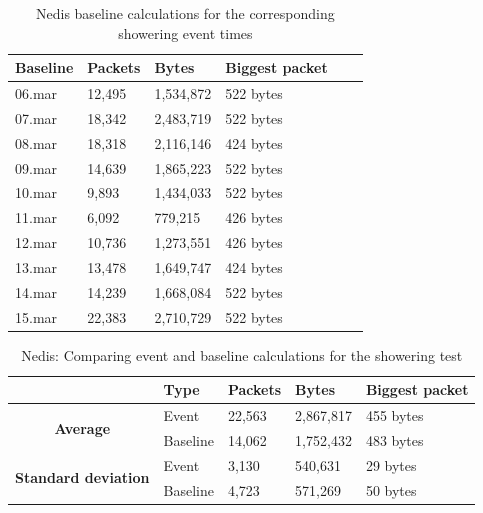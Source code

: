 \begin{table}[H]
    \centering
    \caption{Nedis baseline calculations for the corresponding showering event times}
    \begin{tabular}{|l|l|l|l|l|l|}
    \hline
        \textbf{Baseline} & \textbf{Packets} & \textbf{Bytes} & \textbf{Biggest packet} \\ \hline
        06.mar & 12,495 & 1,534,872 & 522 bytes \\ \hline
        07.mar & 18,342 & 2,483,719 & 522 bytes \\ \hline
        08.mar & 18,318 & 2,116,146 & 424 bytes \\ \hline
        09.mar & 14,639 & 1,865,223 & 522 bytes \\ \hline
        10.mar & 9,893  & 1,434,033 & 522 bytes \\ \hline
        11.mar & 6,092  & 779,215   & 426 bytes \\ \hline
        12.mar & 10,736 & 1,273,551 & 426 bytes \\ \hline
        13.mar & 13,478 & 1,649,747 & 424 bytes \\ \hline
        14.mar & 14,239 & 1,668,084 & 522 bytes \\ \hline
        15.mar & 22,383 & 2,710,729 & 522 bytes \\ \hline
    \end{tabular}
    \label{tab:NedisBaselineShowerCalculations}
\end{table}

\begin{table}[H]
    \centering
    \caption{Nedis: Comparing event and baseline calculations for the showering test}
    \begin{tabular}{c|l|l|l|l|}
        \cline{2-5}
        \multicolumn{1}{l|}{}                                              & \textbf{Type} & \textbf{Packets} & \textbf{Bytes} & \textbf{Biggest packet} \\ \hline
        \multicolumn{1}{|c|}{\multirow{2}{*}{\textbf{Average}}}            & Event         & 22,563             & 2,867,817       & 455 bytes               \\ \cline{2-5} 
        \multicolumn{1}{|c|}{}                                             & Baseline      & 14,062             & 1,752,432       & 483 bytes                \\ \hline
        \multicolumn{1}{|c|}{\multirow{2}{*}{\textbf{Standard deviation}}} & Event         & 3,130              & 540,631         & 29 bytes                 \\ \cline{2-5} 
        \multicolumn{1}{|c|}{}                                             & Baseline      & 4,723              & 571,269         & 50 bytes               \\ \hline          
    \end{tabular}
    \label{tab:NedisComparingBaselineAndShowerCalculations}
\end{table}

